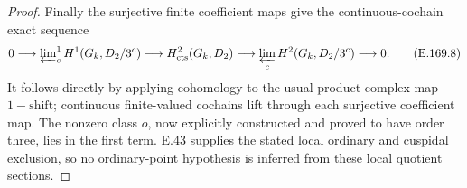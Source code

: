 \begin{proof}
Finally the surjective finite coefficient maps give the
continuous-cochain exact sequence
\[
 0\longrightarrow\varprojlim\nolimits_c^1
                  H^1(G_k,D_2/3^c)
 \longrightarrow H^2_{\mathrm{cts}}(G_k,D_2)
 \longrightarrow\varprojlim_c H^2(G_k,D_2/3^c)
 \longrightarrow0.
\tag{E.169.8}
\]
It follows directly by applying cohomology to the usual
product-complex map \(1-\mathrm{shift}\); continuous finite-valued
cochains lift through each surjective coefficient map.
The nonzero class \(o\), now explicitly constructed and proved
to have order three, lies in the first term.  E.43 supplies
the stated local ordinary and cuspidal exclusion, so no
ordinary-point hypothesis is inferred from these local
quotient sections.
\end{proof}
